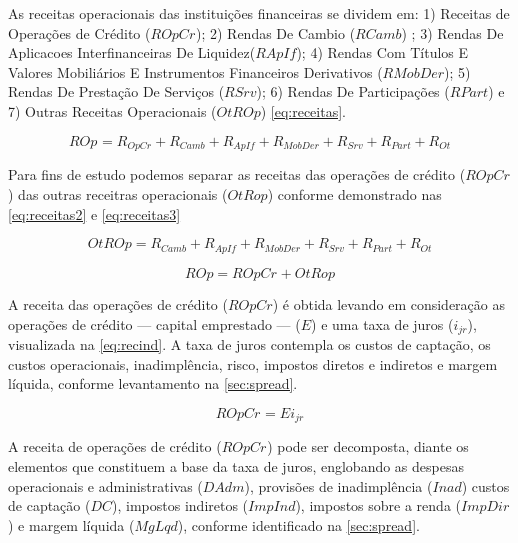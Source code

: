 \documentclass[
  12pt,
  12pt,
  openright,
  oneside,
  a4paper,
  chapter=TITLE,
  section=TITLE,
  subsection=TITLE,
  subsubsection=TITLE,
  english,
  portugues,
  sumario=tradicional]{abntex2}
\begin{document}
\begin{apendicesenv}
As receitas operacionais das instituições financeiras se dividem em: 1) Receitas de Operações de Crédito ($ROpCr_{}$); 2) Rendas De Cambio ($RCamb$) ; 3) Rendas De Aplicacoes Interfinanceiras De Liquidez($RApIf$); 4) Rendas Com Títulos E Valores Mobiliários E Instrumentos Financeiros Derivativos ($RMobDer$); 5) Rendas De Prestação De Serviços ($RSrv$); 6) Rendas De Participações ($RPart$) e 7) Outras Receitas Operacionais ($OtROp$) \autoref{eq:receitas}.


\begin{equation}\label{eq:receitas}
ROp_{} = R_{OpCr} + R_{Camb} + R_{ApIf} + R_{MobDer} + R_{Srv} + R_{Part} + R_{Ot}
\end{equation}


Para fins de estudo podemos separar as receitas das operações de crédito ($ROpCr_{}$) das outras receitras operacionais ($OtRop$) conforme demonstrado nas \autoref{eq:receitas2} e  \autoref{eq:receitas3} 


\begin{equation}\label{eq:receitas2}
OtROp = R_{Camb} + R_{ApIf} + R_{MobDer} + R_{Srv} + R_{Part} + R_{Ot} 
\end{equation}

\begin{equation}\label{eq:receitas3}
ROp = ROpCr_{} + OtRop
\end{equation}

A receita das operações de crédito ($ROpCr$) é obtida levando em  consideração as operações de crédito — capital emprestado — ($E$) e uma taxa de juros ($i_{jr}$), visualizada na \autoref{eq:recind}. A taxa de juros contempla os custos de captação, os custos operacionais, inadimplência, risco, impostos diretos e indiretos e margem líquida, conforme levantamento na \autoref{sec:spread}.



\begin{equation}\label{eq:recind}
ROpCr_{} = Ei_{jr}
\end{equation}



A receita de operações de crédito ($ROpCr_{}$) pode ser decomposta, diante os elementos que constituem a base da taxa de juros,  englobando as despesas operacionais e administrativas ($DAdm$), provisões de inadimplência ($Inad$) custos de captação ($DC$), impostos indiretos ($ImpInd$), impostos sobre a renda ($ImpDir$) e margem líquida ($MgLqd$), conforme identificado na \autoref{sec:spread}.




\end{apendicesenv}
\end{document}
